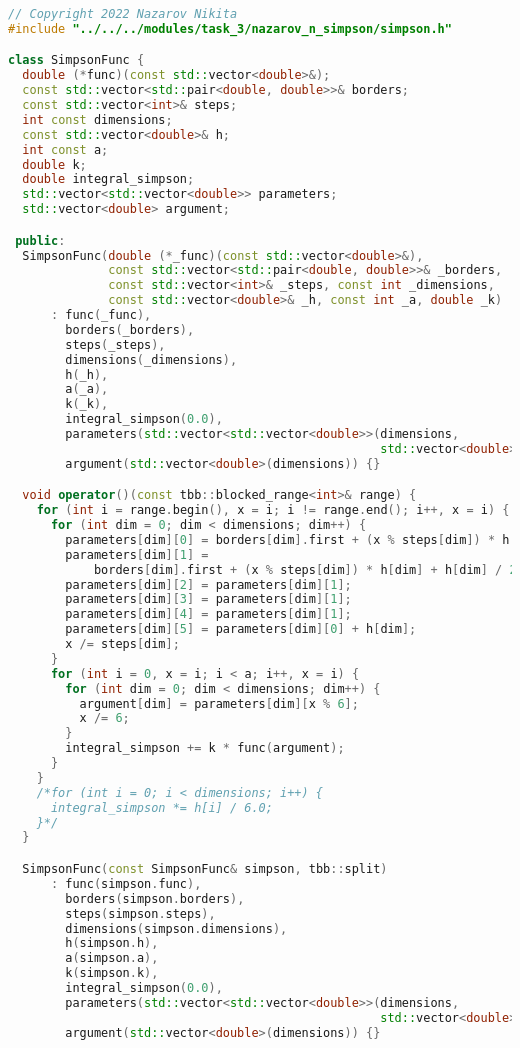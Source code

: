\documentclass{report}
\begin{document}
\begin{lstlisting}[language=C++]
// Copyright 2022 Nazarov Nikita
#include "../../../modules/task_3/nazarov_n_simpson/simpson.h"

class SimpsonFunc {
  double (*func)(const std::vector<double>&);
  const std::vector<std::pair<double, double>>& borders;
  const std::vector<int>& steps;
  int const dimensions;
  const std::vector<double>& h;
  int const a;
  double k;
  double integral_simpson;
  std::vector<std::vector<double>> parameters;
  std::vector<double> argument;

 public:
  SimpsonFunc(double (*_func)(const std::vector<double>&),
              const std::vector<std::pair<double, double>>& _borders,
              const std::vector<int>& _steps, const int _dimensions,
              const std::vector<double>& _h, const int _a, double _k)
      : func(_func),
        borders(_borders),
        steps(_steps),
        dimensions(_dimensions),
        h(_h),
        a(_a),
        k(_k),
        integral_simpson(0.0),
        parameters(std::vector<std::vector<double>>(dimensions,
                                                    std::vector<double>(6))),
        argument(std::vector<double>(dimensions)) {}

  void operator()(const tbb::blocked_range<int>& range) {
    for (int i = range.begin(), x = i; i != range.end(); i++, x = i) {
      for (int dim = 0; dim < dimensions; dim++) {
        parameters[dim][0] = borders[dim].first + (x % steps[dim]) * h[dim];
        parameters[dim][1] =
            borders[dim].first + (x % steps[dim]) * h[dim] + h[dim] / 2;
        parameters[dim][2] = parameters[dim][1];
        parameters[dim][3] = parameters[dim][1];
        parameters[dim][4] = parameters[dim][1];
        parameters[dim][5] = parameters[dim][0] + h[dim];
        x /= steps[dim];
      }
      for (int i = 0, x = i; i < a; i++, x = i) {
        for (int dim = 0; dim < dimensions; dim++) {
          argument[dim] = parameters[dim][x % 6];
          x /= 6;
        }
        integral_simpson += k * func(argument);
      }
    }
    /*for (int i = 0; i < dimensions; i++) {
      integral_simpson *= h[i] / 6.0;
    }*/
  }

  SimpsonFunc(const SimpsonFunc& simpson, tbb::split)
      : func(simpson.func),
        borders(simpson.borders),
        steps(simpson.steps),
        dimensions(simpson.dimensions),
        h(simpson.h),
        a(simpson.a),
        k(simpson.k),
        integral_simpson(0.0),
        parameters(std::vector<std::vector<double>>(dimensions,
                                                    std::vector<double>(6))),
        argument(std::vector<double>(dimensions)) {}


\end{lstlisting}
\end{document}
